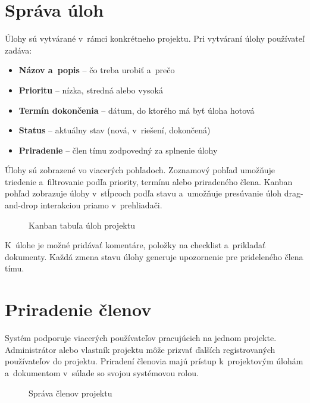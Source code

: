 \section{Správa úloh}

        Úlohy sú vytvárané v~rámci konkrétneho projektu. Pri vytváraní úlohy
používateľ zadáva:

\begin{itemize}
  \item \textbf{Názov a~popis} -- čo treba urobiť a~prečo
  \item \textbf{Prioritu} -- nízka, stredná alebo vysoká
  \item \textbf{Termín dokončenia} -- dátum, do ktorého má byť úloha hotová
  \item \textbf{Status} -- aktuálny stav (nová, v~riešení, dokončená)
  \item \textbf{Priradenie} -- člen tímu zodpovedný za splnenie úlohy
\end{itemize}

        Úlohy sú zobrazené vo viacerých pohľadoch. Zoznamový pohľad umožňuje triedenie
a~filtrovanie podľa priority, termínu alebo priradeného člena. Kanban pohľad
zobrazuje úlohy v~stĺpcoch podľa stavu a~umožňuje presúvanie úloh
drag-and-drop interakciou priamo v~prehliadači.

\begin{figure}[H]
  \centering
  \caption{Kanban tabuľa úloh projektu}
  \label{fig:kanban}
\end{figure}

        K~úlohe je možné pridávať komentáre, položky na checklist a~prikladať dokumenty. Každá zmena stavu
úlohy generuje upozornenie pre prideleného člena tímu.

\section{Priradenie členov}

        Systém podporuje viacerých používateľov pracujúcich na jednom projekte.
Administrátor alebo vlastník projektu môže prizvať ďalších registrovaných
používateľov do projektu. Priradení členovia majú prístup k~projektovým úlohám
a~dokumentom v~súlade so svojou systémovou rolou.

\begin{figure}[H]
  \centering
  \caption{Správa členov projektu}
  \label{fig:clenovia}
\end{figure}
